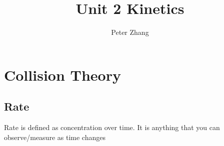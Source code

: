 \documentclass{article}
\title{Unit 2 Kinetics}
\author{Peter Zhang}
\begin{document}
\maketitle
\newpage
\tableofcontents
\newpage


\section{Collision Theory}

\subsection{Rate}
Rate is defined as concentration over time. It is anything that you can observe/measure as time changes

\\

\end{document}
